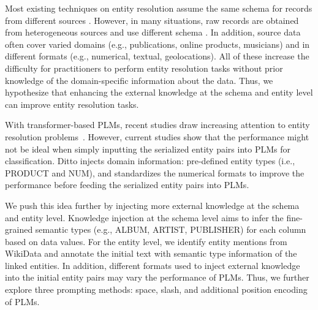 Most existing techniques on entity resolution assume the same schema for records from different sources \cite{elmagarmid_duplicate_2007}. However, in many situations, raw records are obtained from heterogeneous sources and use different schema \cite{enriquez_entity_2017, arabnia_when_2021}. In addition, source data often cover varied domains (e.g., publications, online products, musicians) and in different formats (e.g., numerical, textual, geolocations). 
All of these increase the difficulty for practitioners to perform entity resolution tasks without prior knowledge of the domain-specific information about the data.
Thus, we hypothesize that enhancing the external knowledge at the schema and entity level can improve entity resolution tasks.  

With transformer-based PLMs, recent studies draw increasing attention to entity resolution problems~\cite{li_deep_2020, trabelsi_dame_2022}. However, current studies show that the performance might not be ideal when simply inputting the serialized entity pairs into PLMs for classification. Ditto \cite{li_deep_2020} injects domain information: pre-defined entity types (i.e., PRODUCT and NUM), and standardizes the numerical formats to improve the performance before feeding the serialized entity pairs into PLMs.

We push this idea further by injecting more external knowledge at the schema and entity level. Knowledge injection at the schema level aims to infer the fine-grained semantic types (e.g., ALBUM, ARTIST, PUBLISHER) for each column based on data values. For the entity level, we identify entity mentions from WikiData and annotate the initial text with semantic type information of the linked entities. In addition, different formats used to inject external knowledge into the initial entity pairs may vary the performance of PLMs. Thus, we further explore three prompting methods: space, slash, and additional position encoding of PLMs.

